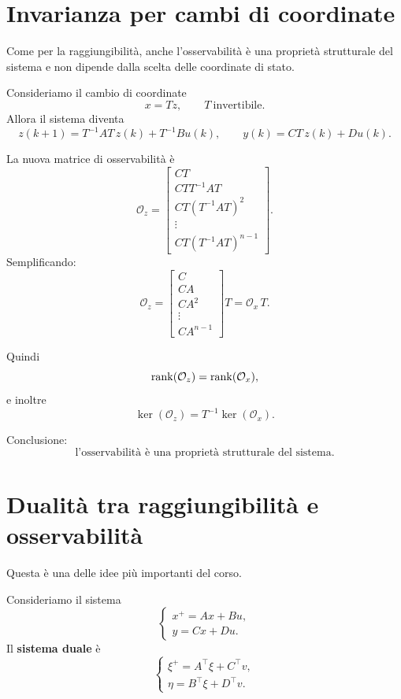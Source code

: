 \section{Invarianza per cambi di coordinate}

Come per la raggiungibilità, anche l'osservabilità è una proprietà strutturale del sistema e non dipende dalla scelta delle coordinate di stato.

Consideriamo il cambio di coordinate
\[
x=Tz,
\qquad T \ \text{invertibile}.
\]
Allora il sistema diventa
\[
z(k+1)=T^{-1}AT\,z(k)+T^{-1}Bu(k),
\qquad
y(k)=CT\,z(k)+Du(k).
\]

La nuova matrice di osservabilità è
\[
\mathcal O_z=
\begin{bmatrix}
CT\\
CTT^{-1}AT\\
CT(T^{-1}AT)^2\\
\vdots\\
CT(T^{-1}AT)^{n-1}
\end{bmatrix}.
\]
Semplificando:
\[
\mathcal O_z=
\begin{bmatrix}
C\\
CA\\
CA^2\\
\vdots\\
CA^{n-1}
\end{bmatrix}T
=
\mathcal O_x\,T.
\]

Quindi
\[
\rank(\mathcal O_z)=\rank(\mathcal O_x),
\]
e inoltre
\[
\ker(\mathcal O_z)=T^{-1}\ker(\mathcal O_x).
\]

Conclusione:
\[
\boxed{
\text{l'osservabilità è una proprietà strutturale del sistema.}
}
\]

\section{Dualità tra raggiungibilità e osservabilità}

Questa è una delle idee più importanti del corso.

Consideriamo il sistema
\[
\begin{cases}
x^+=Ax+Bu,\\
y=Cx+Du.
\end{cases}
\]
Il \textbf{sistema duale} è
\[
\begin{cases}
\xi^+=A^\top \xi + C^\top v,\\
\eta=B^\top \xi + D^\top v.
\end{cases}
\]

